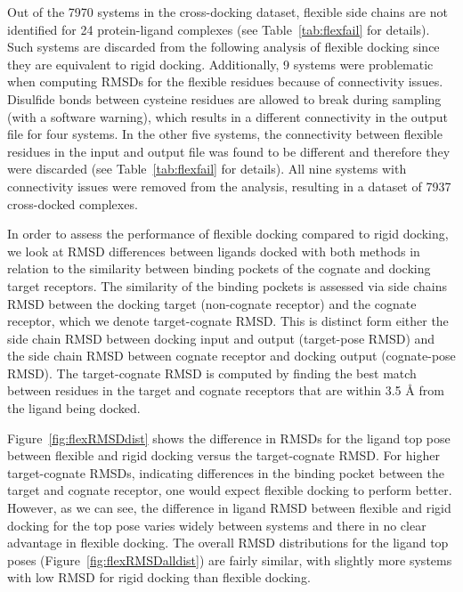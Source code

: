 \documentclass[linenumbers,doublespacing]{bmcart}
\begin{document}
Out of the 7970 systems in the cross-docking dataset, flexible side chains are not identified for 24 protein-ligand complexes (see Table~\ref{tab:flexfail} for details). Such systems are discarded from the following analysis of flexible docking since they are equivalent to rigid docking. Additionally, 9 systems were problematic when computing RMSDs for the flexible residues because of connectivity issues. Disulfide bonds between cysteine residues are allowed to break during sampling (with a software warning), which results in a different connectivity in the output file for four systems. In the other five systems, the connectivity between flexible residues in the input and output file was found to be different and therefore they were discarded (see Table~\ref{tab:flexfail} for details). All nine systems with connectivity issues were removed from the analysis, resulting in a dataset of 7937 cross-docked complexes.

In order to assess the performance of flexible docking compared to rigid docking, we look at RMSD differences between ligands docked with both methods in relation to the similarity between binding pockets of the cognate and docking target receptors. The similarity of the binding pockets is assessed via side chains RMSD between the docking target (non-cognate receptor) and the cognate receptor, which we denote target-cognate RMSD. This is distinct form either the side chain RMSD between docking input and output (target-pose RMSD) and the side chain RMSD between cognate receptor and docking output (cognate-pose RMSD). The target-cognate RMSD is computed by finding the best match between residues in the target and cognate receptors that are within 3.5 {\AA} from the ligand being docked.

Figure~\ref{fig:flexRMSDdist} shows the difference in RMSDs for the ligand top pose between flexible and rigid docking versus the target-cognate RMSD. For higher target-cognate RMSDs, indicating differences in the binding pocket between the target and cognate receptor, one would expect flexible docking to perform better. However, as we can see, the difference in ligand RMSD between flexible and rigid docking for the top pose varies widely between systems and there in no clear advantage in flexible docking. The overall RMSD distributions for the ligand top poses  (Figure~\ref{fig:flexRMSDalldist}) are fairly similar, with slightly more systems with low RMSD for rigid docking than flexible docking.
\end{document}
